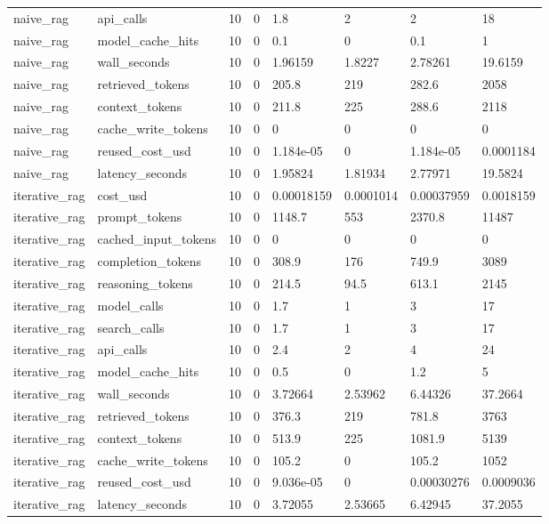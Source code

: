 \begin{tabular}{llllllll}
naive\_rag & api\_calls & 10 & 0 & 1.8 & 2 & 2 & 18 \\
naive\_rag & model\_cache\_hits & 10 & 0 & 0.1 & 0 & 0.1 & 1 \\
naive\_rag & wall\_seconds & 10 & 0 & 1.96159 & 1.8227 & 2.78261 & 19.6159 \\
naive\_rag & retrieved\_tokens & 10 & 0 & 205.8 & 219 & 282.6 & 2058 \\
naive\_rag & context\_tokens & 10 & 0 & 211.8 & 225 & 288.6 & 2118 \\
naive\_rag & cache\_write\_tokens & 10 & 0 & 0 & 0 & 0 & 0 \\
naive\_rag & reused\_cost\_usd & 10 & 0 & 1.184e-05 & 0 & 1.184e-05 & 0.0001184 \\
naive\_rag & latency\_seconds & 10 & 0 & 1.95824 & 1.81934 & 2.77971 & 19.5824 \\
iterative\_rag & cost\_usd & 10 & 0 & 0.00018159 & 0.0001014 & 0.00037959 & 0.0018159 \\
iterative\_rag & prompt\_tokens & 10 & 0 & 1148.7 & 553 & 2370.8 & 11487 \\
iterative\_rag & cached\_input\_tokens & 10 & 0 & 0 & 0 & 0 & 0 \\
iterative\_rag & completion\_tokens & 10 & 0 & 308.9 & 176 & 749.9 & 3089 \\
iterative\_rag & reasoning\_tokens & 10 & 0 & 214.5 & 94.5 & 613.1 & 2145 \\
iterative\_rag & model\_calls & 10 & 0 & 1.7 & 1 & 3 & 17 \\
iterative\_rag & search\_calls & 10 & 0 & 1.7 & 1 & 3 & 17 \\
iterative\_rag & api\_calls & 10 & 0 & 2.4 & 2 & 4 & 24 \\
iterative\_rag & model\_cache\_hits & 10 & 0 & 0.5 & 0 & 1.2 & 5 \\
iterative\_rag & wall\_seconds & 10 & 0 & 3.72664 & 2.53962 & 6.44326 & 37.2664 \\
iterative\_rag & retrieved\_tokens & 10 & 0 & 376.3 & 219 & 781.8 & 3763 \\
iterative\_rag & context\_tokens & 10 & 0 & 513.9 & 225 & 1081.9 & 5139 \\
iterative\_rag & cache\_write\_tokens & 10 & 0 & 105.2 & 0 & 105.2 & 1052 \\
iterative\_rag & reused\_cost\_usd & 10 & 0 & 9.036e-05 & 0 & 0.00030276 & 0.0009036 \\
iterative\_rag & latency\_seconds & 10 & 0 & 3.72055 & 2.53665 & 6.42945 & 37.2055 \\

\end{tabular}
